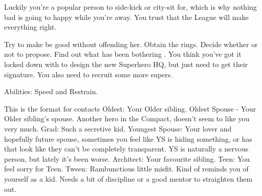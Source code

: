 \documentclass[char]{LRSguildcamp1}
\begin{document}
Luckily you're a popular person to side-kick or city-sit for, which is why nothing bad is going to happy while you're away. You trust that the League will make everything right.  


\begin{itemz}[Goals]
	\item 
	Try to make \cGrandma{} be good without offending her. 
	Obtain the rings.
	Decide whether or not to propose. 
	Find out what has been bothering \cYS{}. 
	You think you’ve got it locked down with \cArchitect{} to design the new Superhero HQ, but just need to get their signature. 
	You also need to recruit some more supers. 
	
\end{itemz}

\begin{itemz}[Notes]
	\item 
	Abilities: Speed and Restrain.
\end{itemz}

\begin{contacts}
	\contact{}  This is the format for contacts 
	Oldest: Your Older sibling. 
	Oldest Spouse - Your Older sibling’s spouse. Another hero in the Compact, doesn’t seem to like you very much. 
	Grad: Such a secretive kid. 
	Youngest Spouse: Your lover and hopefully future spouse, sometimes you feel like YS is hiding something, or has that look like they can’t be completely transparent. YS is naturally a nervous person, but lately it’s been worse. 
	Architect: Your favourite sibling. 
	Teen: You feel sorry for Teen. 
	Tween: Rambunctious little misfit. Kind of reminds you of yourself as a kid. Needs a bit of discipline or a good mentor to straighten them out. 
	
\end{contacts}
\end{document}
